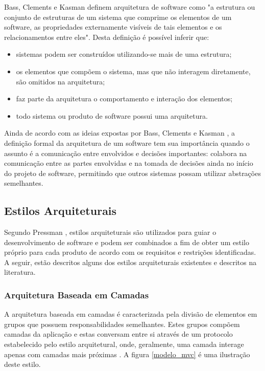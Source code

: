Bass, Clements e Kasman \cite{bass_software_archi_practice_2003} definem arquitetura de software como "a estrutura ou conjunto de estruturas de um sistema que comprime os elementos de um software, as propriedades externamente visíveis de tais elementos e os relacionamentos entre eles". Desta definição é possível inferir que:
\begin{itemize}
\item sistemas podem ser construídos utilizando-se mais de uma estrutura;
\item os elementos que compõem o sistema, mas que não interagem diretamente, são omitidos na arquitetura;
\item faz parte da arquitetura o comportamento e interação dos elementos;
\item todo sistema ou produto de software possui uma arquitetura.
\end{itemize}

Ainda de acordo com as ideias expostas por Bass, Clements e Kasman \cite{bass_software_archi_practice_2003}, a definição formal da arquitetura de um software tem sua importância quando o assunto é a comunicação entre envolvidos e decisões importantes: colabora na comunicação entre as partes envolvidas e na tomada de decisões ainda no início do projeto de software, permitindo que outros sistemas possam utilizar abstrações semelhantes.

\subsection{Estilos Arquiteturais}
Segundo Pressman \cite{pressman2006engenharia}, estilos arquiteturais são utilizados para guiar o desenvolvimento de software e podem ser combinados a fim de obter um estilo próprio para cada produto de acordo com os requisitos e restrições identificadas. A seguir, estão descritos alguns dos estilos arquiteturais existentes e descritos na literatura.

\subsubsection{Arquitetura Baseada em Camadas}
A arquitetura baseada em camadas é caracterizada pela divisão de elementos em grupos que possuem responsabilidades semelhantes. Estes grupos compõem camadas da aplicação e estas conversam entre si através de um protocolo estabelecido pelo estilo arquitetural, onde, geralmente, uma camada interage apenas com camadas mais próximas \cite{pressman2006engenharia}. A figura \ref{modelo_mvc} é uma ilustração deste estilo.

